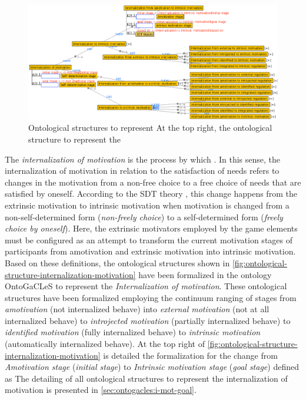 \begin{figure}[!htbp]
 \caption[Ontological structures to represent internalization of motivation]{Ontological structures to represent  At the top right, the ontological structure to represent the }
 \label{fig:ontological-structure-internalization-motivation}
 \centering
 \includegraphics[width=1\textwidth]{images/chap-ontogacles1/ontological-structure-internalization-motivation.png}
 \fautor
\end{figure}

The \emph{internalization of motivation} is the process by which  \cite{GagneDeci2005}. In this sense, the internalization of motivation in relation to the satisfaction of needs refers to changes in the motivation from a non-free choice to a free choice of needs that are satisfied by oneself. According to the SDT theory \cite{DeciRyan1985, RyanDeci2000}, this change happens from the extrinsic motivation to intrinsic motivation when motivation is changed from a non-self-determined form (\emph{non-freely choice}) to a self-determined form (\emph{freely choice by oneself}). Here, the extrinsic motivators employed by the game elements must be configured as an attempt to transform the current motivation stages of participants from amotivation and extrinsic motivation into intrinsic motivation. Based on these definitions, the ontological structures shown in \autoref{fig:ontological-structure-internalization-motivation} have been formalized in the ontology OntoGaCLeS to represent the \emph{Internalization of motivation}. These ontological structures have been formalized employing the continuum ranging of stages from \emph{amotivation} (not internalized behave) into \emph{external motivation} (not at all internalized behave) to \emph{introjected motivation} (partially internalized behave) to \emph{identified motivation} (fully internalized behave) to \emph{intrinsic motivation} (automatically internalized behave). At the top right of \autoref{fig:ontological-structure-internalization-motivation} is detailed the formalization for the change from \emph{Amotivation stage} (\emph{initial stage}) to \emph{Intrinsic motivation stage} (\emph{goal stage}) defined as  The detailing of all ontological structures to represent the internalization of motivation is presented in \autoref{sec:ontogacles:i-mot-goal}.

